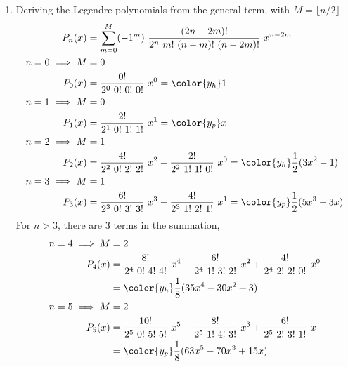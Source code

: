 \begin{enumerate}
    \item Deriving the Legendre polynomials from the general term, with
          $ M = \lfloor n/2 \rfloor $
          \begin{align}
              P_n(x)           & = \sum_{m = 0}^{M} (-1^m)\ \frac{(2n - 2m)!}
              {2^n\ m!\ (n-m)!\ (n-2m)!}\ x^{n-2m}                            \\
              n = 0 \implies M & = 0                                          \\
              P_0(x)           & = \frac{0!}{2^0\ 0!\ 0!\ 0!}\ x^0
              = {\color{y_h} 1}                                               \\
              n = 1 \implies M & = 0                                          \\
              P_1(x)           & = \frac{2!}{2^1\ 0!\ 1!\ 1!}\ x^1
              = {\color{y_p}x}                                                \\
              n = 2 \implies M & = 1                                          \\
              P_2(x)           & = \frac{4!}{2^2\ 0!\ 2!\ 2!}\ x^2
              - \frac{2!}{2^2\ 1!\ 1!\ 0!}\ x^0
              = {\color{y_h} \frac{1}{2}(3x^2 - 1)}                           \\
              n = 3 \implies M & = 1                                          \\
              P_3(x)           & = \frac{6!}{2^3\ 0!\ 3!\ 3!}\ x^3
              - \frac{4!}{2^3\ 1!\ 2!\ 1!}\ x^1
              = {\color{y_p}\frac{1}{2}(5x^3 - 3x)}
          \end{align}
          For $ n>3 $, there are $ 3 $ terms in the summation,
          \begin{align}
              n = 4 \implies M & = 2                                             \\
              P_4(x)           & = \frac{8!}{2^4\ 0!\ 4!\ 4!}\ x^4
              - \frac{6!}{2^4\ 1!\ 3!\ 2!}\ x^2
              + \frac{4!}{2^4\ 2!\ 2!\ 0!}\ x^0                                  \\
                               & = {\color{y_h} \frac{1}{8}(35x^4 - 30x^2 + 3)}  \\
              n = 5 \implies M & = 2                                             \\
              P_5(x)           & = \frac{10!}{2^5\ 0!\ 5!\ 5!}\ x^5
              - \frac{8!}{2^5\ 1!\ 4!\ 3!}\ x^3
              + \frac{6!}{2^5\ 2!\ 3!\ 1!}\ x                                    \\
                               & = {\color{y_p}\frac{1}{8}(63x^5 - 70x^3 + 15x)}
          \end{align}


\end{enumerate}
